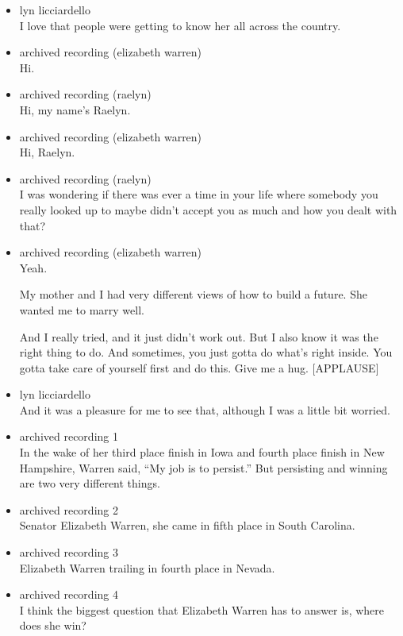 \begin{itemize}
\item
  lyn licciardello\\
  I love that people were getting to know her all across the country.
\item
  archived recording (elizabeth warren)\\
  Hi.
\item
  archived recording (raelyn)\\
  Hi, my name's Raelyn.
\item
  archived recording (elizabeth warren)\\
  Hi, Raelyn.
\item
  archived recording (raelyn)\\
  I was wondering if there was ever a time in your life where somebody
  you really looked up to maybe didn't accept you as much and how you
  dealt with that?
\item
  archived recording (elizabeth warren)\\
  Yeah.

  My mother and I had very different views of how to build a future. She
  wanted me to marry well.

  And I really tried, and it just didn't work out. But I also know it
  was the right thing to do. And sometimes, you just gotta do what's
  right inside. You gotta take care of yourself first and do this. Give
  me a hug. {[}APPLAUSE{]}
\item
  lyn licciardello\\
  And it was a pleasure for me to see that, although I was a little bit
  worried.
\item
  archived recording 1\\
  In the wake of her third place finish in Iowa and fourth place finish
  in New Hampshire, Warren said, ``My job is to persist.'' But
  persisting and winning are two very different things.
\item
  archived recording 2\\
  Senator Elizabeth Warren, she came in fifth place in South Carolina.
\item
  archived recording 3\\
  Elizabeth Warren trailing in fourth place in Nevada.
\item
  archived recording 4\\
  I think the biggest question that Elizabeth Warren has to answer is,
  where does she win?
\end{itemize}


